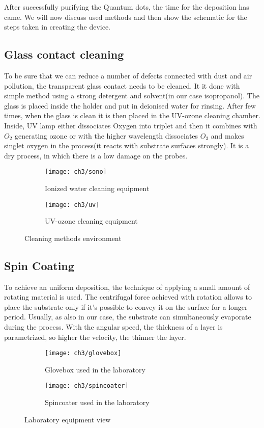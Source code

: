 After successfully purifying the Quantum dots, the time for the deposition has came. We will now discuss used methods and then show the schematic for the steps taken in creating the device. 

\subsection{Glass contact cleaning}

To be sure that we can reduce a number of defects connected with dust and air pollution, the transparent glass contact needs to be cleaned. It it done with simple method using a strong detergent and solvent(in our case isopropanol). The glass is placed inside the holder and put in deionised water for rinsing. After few times, when the glass is clean it is then placed in the UV-ozone cleaning chamber. Inside, UV lamp either dissociates Oxygen into triplet and then it combines with $O_2$ generating ozone or with the higher wavelength dissociates $O_3$ and makes singlet oxygen in the process(it reacts with substrate surfaces strongly). It is a dry process, in which there is a low damage on the probes. 

\begin{figure}[ht]
\begin{subfigure}{.5\textwidth}
  \centering
  \texttt{[image: ch3/sono]}  
  \caption{Ionized water cleaning equipment}
\end{subfigure}
\begin{subfigure}{.5\textwidth}
  \centering
  \texttt{[image: ch3/uv]}  
  \caption{UV-ozone cleaning equipment}
\end{subfigure}
\caption{Cleaning methods environment}
\label{fig:clean}
\end{figure}

\subsection{Spin Coating}
To achieve an uniform deposition, the technique of applying a small amount of rotating material is used. The centrifugal force achieved with rotation allows to place the substrate only if it's possible to convey it on the surface for a longer period. Usually, as also in our case, the substrate can simultaneously evaporate during the process. With the angular speed, the thickness of a layer is parametrized, so higher the velocity, the thinner the layer. 


\begin{figure}[H]
\begin{subfigure}{.5\textwidth}
  \centering
  \texttt{[image: ch3/glovebox]}  
  \caption{Glovebox used in the laboratory}
\end{subfigure}
\begin{subfigure}{.5\textwidth}
  \centering
  \texttt{[image: ch3/spincoater]}  
  \caption{Spincoater used in the laboratory}
\end{subfigure}
\label{fig:gloves}
\caption{Laboratory equipment view}
\end{figure}

